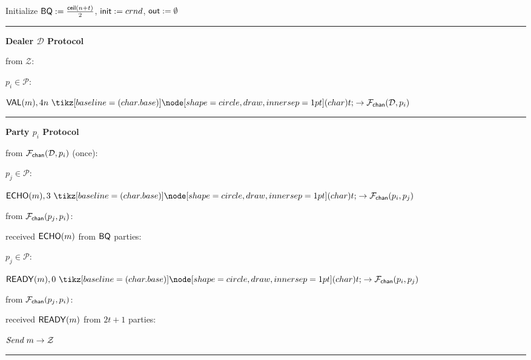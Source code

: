 \begin{bbox}[title={$\Pi_{\msf{Bracha}} (\mathcal{D}, \mathcal{P} = p_1,...,p_n)$ in $\F_{\msf{sync-chan}}$-hybrid}]

Initialize ${\mathsf {BQ}} := \frac{{\mathsf {ceil}}(n+t)}{2}$, ${\mathsf {init}} := crnd$, ${\mathsf {out}} := \emptyset$

\vspace{2mm} \hrule \vspace{2mm}

{\bf Dealer $\mathcal{D}$ Protocol}

\OnInput {} from $\mathcal{Z}$:
	\begin{renumerate}
	\item \For $p_i \in \mathcal{P}$:

		\quad  \Send $\msf{VAL}(m),4n \token \rightarrow \Fchan{\mathcal{D}}{p_i}$
	\end{renumerate}

\vspace{2mm} \hrule \vspace{2mm}

{\bf Party $p_i$ Protocol}

\OnInput {} from $\mathcal{F}_{{\mathsf {chan}}}(\mathcal{D},p_i)$ (once):
	\begin{renumerate}
	\item \For $p_j \in \mathcal{P}$: 
	
	\quad \Send $\msf{ECHO}(m), 3 \token \rightarrow \Fchan{p_i}{p_j}$\\
	\end{renumerate}


\OnInput {} from $\mathcal{F}_{{\mathsf {chan}}}(p_j,p_i)$:
	\begin{renumerate}
	\item \If received ${\mathsf {ECHO}}(m)$ from ${\mathsf {BQ}}$ parties:
		\begin{ritemize}
		\item \For $p_j \in \mathcal{P}$: 
		
		\quad \Send $\msf{READY}(m), 0 \token \rightarrow \Fchan{p_i}{p_j}$ \\
		\end{ritemize}
	\end{renumerate}

\OnInput {} from $\mathcal{F}_{{\mathsf {chan}}}(p_j,p_i)$:
	\begin{renumerate}
	\item \If received ${\mathsf {READY}}(m)$ from $2t+1$ parties:
		\begin{ritemize}
		\item $\emph{Send}~ m \rightarrow \mathcal{Z}$
		\end{ritemize}
	\end{renumerate}

\vspace{2mm} \hrule \vspace{2mm}

\end{bbox}

